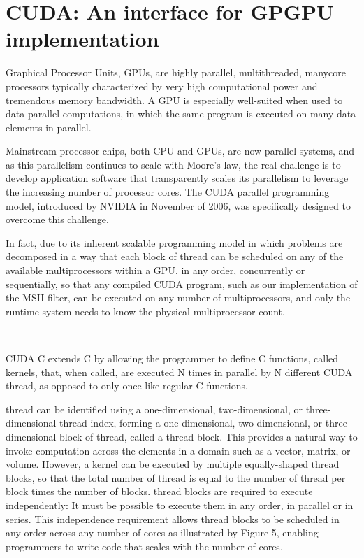 \section{CUDA: An interface for GPGPU implementation}
Graphical Processor Units, GPUs, are highly parallel, multithreaded, manycore 
processors typically characterized by very high computational power and 
tremendous memory bandwidth. A GPU is especially well-suited when used to 
data-parallel computations, in which the same program is executed on many data 
elements in parallel.~\cite[p.~1.1]{CUDA18}

Mainstream processor chips, both CPU and GPUs, are now parallel systems, and as 
this parallelism continues to scale with Moore's law, the real challenge is to 
develop application software that transparently scales its parallelism to 
leverage the increasing number of processor cores. The CUDA parallel 
programming model, introduced by NVIDIA in November of 2006, was specifically 
designed to overcome this challenge.~\cite[p.~1.3]{CUDA18}

In fact, due to its inherent scalable programming model in which problems are 
decomposed in a way that each block of thread can be scheduled on 
any of the available multiprocessors within a GPU, in any order, concurrently 
or sequentially, so that any compiled CUDA program, such as our implementation 
of the MSII filter, can be executed on any number of multiprocessors, and only 
the runtime system needs to know the physical multiprocessor 
count.~\cite[p.~1.3]{CUDA18}

~~~~~~~~~

CUDA C extends C by allowing the programmer to define C functions, called 
kernels, that, when called, are executed N times in parallel by N different 
CUDA thread, as opposed to only once like regular C 
functions.~\cite[p.~2.1]{CUDA18}

thread can be identified using a one-dimensional, 
two-dimensional, or three-dimensional thread index, forming a 
one-dimensional, two-dimensional, or three-dimensional block of 
thread, called a thread block. This provides a 
natural way to invoke computation across the elements in a domain such as a 
vector, matrix, or volume. However, a kernel can be executed by multiple 
equally-shaped thread blocks, so that the total number of 
thread is equal to the number of thread per block 
times the number of blocks. thread blocks are required to execute 
independently: It must be possible to execute them in any order, in parallel or 
in series. This independence requirement allows thread blocks to 
be scheduled in any order across any number of cores as illustrated by Figure 5, 
enabling programmers to write code that scales with the number of 
cores.~\cite[p.~2.2]{CUDA18}

